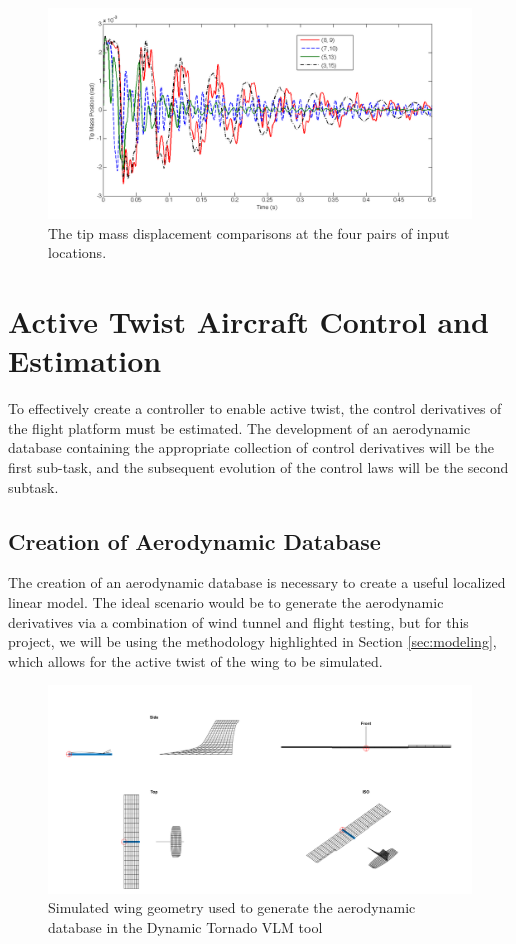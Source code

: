\documentclass[11pt]{ucthesis}
\begin{document}
\begin{figure}[thpb]
\centering
\includegraphics[width=1\linewidth]{Figures/twoinput_tip.png}
\caption{The tip mass displacement comparisons at the four pairs of input locations.}
\label{twosystemP}
\end{figure}

\section{Active Twist Aircraft Control and Estimation}
To effectively create a controller to enable active twist, the control derivatives of the flight platform must be estimated. The development of an aerodynamic database containing the appropriate collection of control derivatives will be the first sub-task, and the subsequent evolution of the control laws will be the second subtask.

\subsection{Creation of Aerodynamic Database}
The creation of an aerodynamic database is necessary to create a useful localized linear model. The ideal scenario would be to generate the aerodynamic derivatives via a combination of wind tunnel and flight testing, but for this project, we will be using the methodology highlighted in Section \ref{sec:modeling}, which allows for the active twist of the wing to be simulated.

\begin{figure}[thpb]
\centering
\includegraphics[width=1\linewidth]{Figures/SimulationMultiAngleView.png}
\caption{Simulated wing geometry used to generate the aerodynamic database in the Dynamic Tornado VLM tool}
\label{fig:AmultiAngle}
\end{figure}
\end{document}
